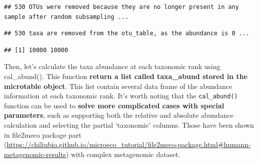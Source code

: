 \documentclass[
]{book}
\newenvironment{Shaded}{\begin{snugshade}}{\end{snugshade}}
\newcommand{\AttributeTok}[1]{\textcolor[rgb]{0.77,0.63,0.00}{#1}}
\newcommand{\CommentTok}[1]{\textcolor[rgb]{0.56,0.35,0.01}{\textit{#1}}}
\newcommand{\DecValTok}[1]{\textcolor[rgb]{0.00,0.00,0.81}{#1}}
\newcommand{\FunctionTok}[1]{\textcolor[rgb]{0.00,0.00,0.00}{#1}}
\newcommand{\NormalTok}[1]{#1}
\newcommand{\SpecialCharTok}[1]{\textcolor[rgb]{0.00,0.00,0.00}{#1}}
\begin{document}
\begin{Shaded}
\end{Shaded}

\begin{verbatim}
## 530 OTUs were removed because they are no longer present in any sample after random subsampling ...
\end{verbatim}

\begin{verbatim}
## 530 taxa are removed from the otu_table, as the abundance is 0 ...
\end{verbatim}

\begin{Shaded}
\end{Shaded}

\begin{verbatim}
## [1] 10000 10000
\end{verbatim}

Then, let's calculate the taxa abundance at each taxonomic rank using cal\_abund().
This function \textbf{return a list called taxa\_abund stored in the microtable object}.
This list contain several data frame of the abundance information at each taxonomic rank.
It's worth noting that the \texttt{cal\_abund()} function can be used to \textbf{solve more complicated cases with special parameters},
such as supporting both the relative and absolute abundance calculation and selecting the partial `taxonomic' columns.
Those have been shown in file2meco package part (\url{https://chiliubio.github.io/microeco_tutorial/file2meco-package.html\#humann-metagenomic-results}) with complex metagenomic dataset.

\begin{Shaded}
\end{Shaded}
\end{document}
